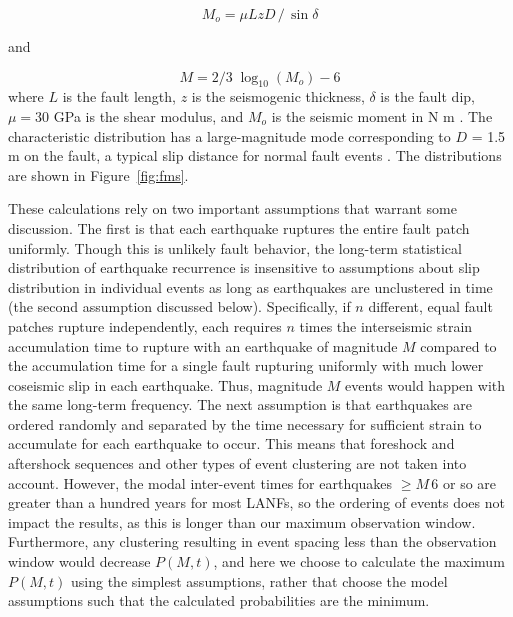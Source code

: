 \documentclass[draft,grl]{AGUTeX}
\begin{document}
\begin{article}
\begin{equation}
 M_o = \mu L z D \,/ \, \sin \delta 
 \end{equation}

and

\begin{equation}
M = 2/3 \; \log_{10} (M_o) - 6
\end{equation}
where $L$ is the fault length, $z$ is the seismogenic thickness, $\delta$ is
the fault dip, $\mu = 30$ GPa is the shear modulus, and $M_o$ is the seismic
moment in N m \citep[e.g.,][]{akirichards2002, kagan2003pepi}.  The
characteristic distribution has a large-magnitude mode corresponding to $D$
= 1.5 m on the fault, a typical slip distance for normal fault events
\citep[e.g.][]{wesnousky2008displacement}.  The distributions are shown in
Figure~\ref{fig:fms}.

These calculations rely on two important assumptions that warrant some
discussion. The first is that each earthquake ruptures the entire fault patch
uniformly. Though this is unlikely fault behavior, the long-term statistical
distribution of earthquake recurrence is insensitive to assumptions about slip
distribution in individual events as long as earthquakes are unclustered in
time (the second assumption discussed below).  Specifically, if $n$ different,
equal fault patches rupture independently, each requires $n$ times the
interseismic strain accumulation time to rupture with an earthquake of
magnitude $M$ compared to the accumulation time for a single fault rupturing
uniformly with much lower coseismic slip in each earthquake. Thus, magnitude
$M$ events would happen with the same long-term frequency. The next assumption
is that earthquakes are ordered randomly and separated by the time necessary
for sufficient strain to accumulate for each earthquake to occur.  This means
that foreshock and aftershock sequences and other types of event clustering are
not taken into account.  However, the modal inter-event times for earthquakes
$\ge M \,6$ or so are greater than a hundred years for most LANFs, so the
ordering of events does not impact the results, as this is longer than our
maximum observation window.  Furthermore, any clustering resulting in event
spacing less than the observation window would decrease $P(M,t)$, and here we
choose to calculate the maximum $P(M,t)$ using the simplest assumptions, rather
that choose the model assumptions such that the calculated probabilities are
the minimum.


\end{article}
\end{document}

